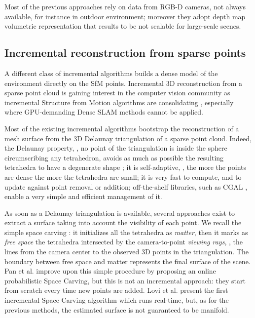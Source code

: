 Most of the previous approaches rely on data from RGB-D cameras, not always available, for instance in outdoor environment; moreover they adopt depth map  volumetric representation that results to be not scalable for large-scale scenes.  

\subsection{Incremental reconstruction from sparse points}
A different class of incremental algorithms builds a dense model of the environment directly on the SfM points.
Incremental 3D reconstruction from a sparse point cloud is gaining interest in the computer vision community as incremental Structure from Motion algorithms are consolidating  \cite{wu13}, especially where GPU-demanding Dense SLAM methods cannot be applied. 

Most of the existing incremental algorithms \cite{Lovi_et_al_11,Pan_et_al09,litvinov_lhuillier_13,litvinov_Lhiuller14} bootstrap the reconstruction of a mesh surface from the 3D Delaunay triangulation of a sparse point cloud. Indeed, the Delaunay property, \ie, no point of the triangulation is inside the sphere circumscribing any tetrahedron, avoids as much as possible the resulting tetrahedra to have a degenerate shape \cite{Maur_02}; it is self-adaptive, \ie, the more the points are dense the more the tetrahedra are small; it is very fast to compute, and to  update against point removal or addition; off-the-shelf libraries, such as CGAL \cite{cgal}, enable a very simple and efficient management of it. 

As soon as a Delaunay triangulation is available, several approaches exist to extract a surface taking into account the visibility of each point. 
We recall the simple space carving \cite{kutulakos_seitz05}: it initializes all the tetrahedra as \emph{matter}, then it marks as \emph{free space} the tetrahedra intersected by the camera-to-point \emph{viewing rays}, \ie, the lines from the camera center to the observed 3D points in the triangulation. 
The boundary between free space and matter represents the final surface of the scene.
Pan et al. \cite{Pan_et_al09} improve upon this simple procedure by proposing an online probabilistic Space Carving, but this is not an incremental approach: they start from scratch every time new points are added.
Lovi et al. \cite{Lovi_et_al_11} present the first incremental Space Carving algorithm which runs real-time, but, as for the previous methods, the estimated surface is not guaranteed to be manifold.

